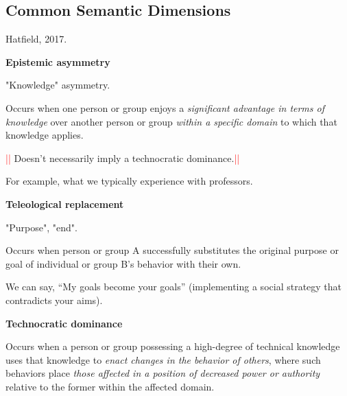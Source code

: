 \subsection*{Common Semantic Dimensions}
\begin{center}
    Hatfield, 2017.
\end{center}
\raggedcolumns
\begin{multicols}{2}
    \begin{center}
    \textbf{Epistemic asymmetry}
    \end{center}
    "Knowledge" asymmetry.

    Occurs when one person or group enjoys a \textit{significant advantage in terms of knowledge} over another person or group \textit{within a specific domain} to which that knowledge applies. 

    \vspace{0.1cm}

    \textcolor{Red}{||} Doesn't necessarily imply a technocratic dominance.\textcolor{Red}{||}

    \vspace{0.2cm}
    For example, what we typically experience with professors.

    \columnbreak

    \begin{center}
    \textbf{Teleological replacement}
    \end{center}
    "Purpose", "end".

    Occurs when person or group A successfully substitutes the original purpose or goal of individual or group B’s behavior with their own.

    \vspace{0.1cm}

    We can say, “My goals become your goals” (implementing a social strategy that contradicts your aims).
    
\end{multicols}

    \begin{center}
        \textbf{Technocratic dominance}
        \end{center}
    
        Occurs when a person or group possessing a high-degree of technical knowledge uses that knowledge to \textit{enact changes in the behavior of others}, where such behaviors place \textit{those affected in a position of decreased power or authority} relative to the former within the affected domain.
        
